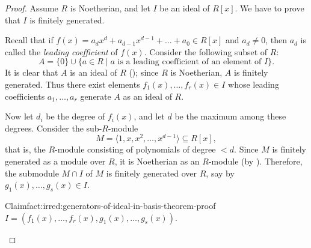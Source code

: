 \begin{proof}
  Assume $R$ is Noetherian, and let $I$ be an ideal of $R[x]$. We have
  to prove that $I$ is finitely generated.

  Recall that if
  $f(x) = a_d x^d + a_{d-1} x^{d-1} + \dots + a_0 \in R[x]$ and
  $a_d \neq 0$, then $a_d$ is called the \emph{leading coefficient} of
  $f(x)$. Consider the following subset of $R$:
  \[A = \{0\} \cup \{a \in R \mid a \text{ is a leading coefficient of
      an element of } I\}.\] It is clear that $A$ is an ideal of $R$
  (); since $R$ is
  Noetherian, $A$ is finitely generated. Thus there exist elements
  $f_1(x), \dots, f_r(x) \in I$ whose leading coefficients
  $a_1, \dots, a_r$ generate $A$ as an ideal of $R$.

  Now let $d_i$ be the degree of $f_i(x)$, and let $d$ be the maximum
  among these degrees. Consider the sub-$R$-module
  \[M = \langle 1, x, x^2, \dots, x^{d-1} \rangle \subseteq R[x],\]
  that is, the $R$-module consisting of polynomials of degree $<
  d$. Since $M$ is finitely generated as a module over $R$, it is
  Noetherian as an $R$-module (by
  ). Therefore,
  the submodule $M \cap I$ of $M$ is finitely generated over $R$, say
  by $g_1(x), \dots, g_s(x) \in I$.

\begin{fact}{Claim}{fact:irred:generators-of-ideal-in-basis-theorem-proof}
  $I = (f_1(x), \dots, f_r(x), g_1(x), \dots, g_s(x))$.
\end{fact}


\end{proof}

